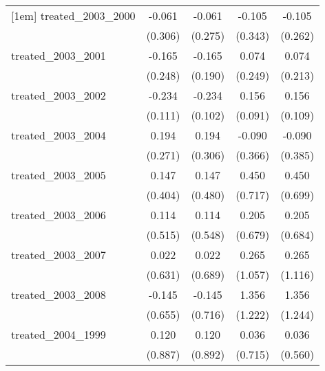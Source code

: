 {\begin{tabular}{l*{4}{c}}
[1em]
treated\_2003\_2000&      -0.061         &      -0.061         &      -0.105         &      -0.105         \\
            &     (0.306)         &     (0.275)         &     (0.343)         &     (0.262)         \\
[1em]
treated\_2003\_2001&      -0.165         &      -0.165         &       0.074         &       0.074         \\
            &     (0.248)         &     (0.190)         &     (0.249)         &     (0.213)         \\
[1em]
treated\_2003\_2002&      -0.234\sym{*}  &      -0.234\sym{*}  &       0.156         &       0.156         \\
            &     (0.111)         &     (0.102)         &     (0.091)         &     (0.109)         \\
[1em]
treated\_2003\_2004&       0.194         &       0.194         &      -0.090         &      -0.090         \\
            &     (0.271)         &     (0.306)         &     (0.366)         &     (0.385)         \\
[1em]
treated\_2003\_2005&       0.147         &       0.147         &       0.450         &       0.450         \\
            &     (0.404)         &     (0.480)         &     (0.717)         &     (0.699)         \\
[1em]
treated\_2003\_2006&       0.114         &       0.114         &       0.205         &       0.205         \\
            &     (0.515)         &     (0.548)         &     (0.679)         &     (0.684)         \\
[1em]
treated\_2003\_2007&       0.022         &       0.022         &       0.265         &       0.265         \\
            &     (0.631)         &     (0.689)         &     (1.057)         &     (1.116)         \\
[1em]
treated\_2003\_2008&      -0.145         &      -0.145         &       1.356         &       1.356         \\
            &     (0.655)         &     (0.716)         &     (1.222)         &     (1.244)         \\
[1em]
treated\_2004\_1999&       0.120         &       0.120         &       0.036         &       0.036         \\
            &     (0.887)         &     (0.892)         &     (0.715)         &     (0.560)         \\

\end{tabular}}

